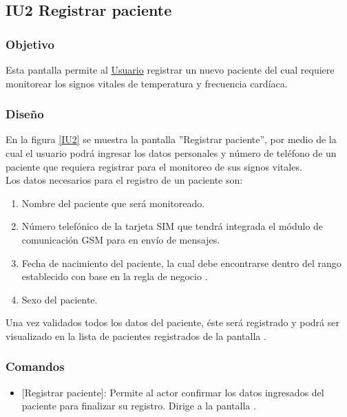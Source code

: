 \subsection{IU2 Registrar paciente}

\subsubsection{Objetivo}
	
Esta pantalla permite al \hyperlink{actor:usuario}{Usuario} registrar un nuevo paciente del cual requiere monitorear los signos vitales de temperatura y frecuencia cardíaca.

\subsubsection{Diseño}
En la figura \ref{IU2} se muestra la pantalla ''Registrar paciente'', por medio de la cual el usuario podrá ingresar los datos personales y número de teléfono de un paciente que requiera registrar para el monitoreo de sus signos vitales.\\

Los datos necesarios para el registro de un paciente son:
\begin{enumerate}
	\item Nombre del paciente que será monitoreado.
	\item Número telefónico de la tarjeta SIM que tendrá integrada el módulo de comunicación GSM para en envío de mensajes.
	\item Fecha de nacimiento del paciente, la cual debe encontrarse dentro del rango establecido con base en la regla de negocio .
	\item Sexo del paciente.
\end{enumerate}

Una vez validados todos los datos del paciente, éste será registrado y podrá ser visualizado en la lista de pacientes registrados de la pantalla .

    

\subsubsection{Comandos}
	\begin{itemize}
		\item \btnRegistrar{} [Registrar paciente]: Permite al actor confirmar los datos ingresados del paciente para finalizar su registro. Dirige a la pantalla .
	\end{itemize}
\clearpage